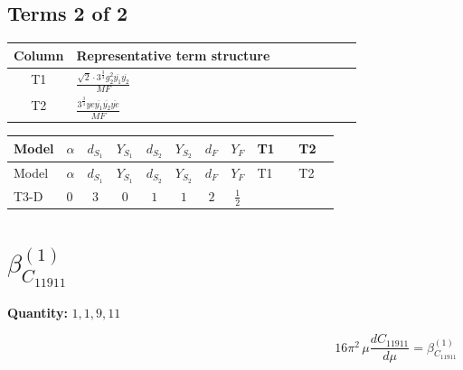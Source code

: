 \documentclass[8pt]{article}
\begin{document}
\begin{landscape}
\subsection*{Terms 2 of 2}
\begin{center}
\begin{tabular}{@{}c >{\raggedright\arraybackslash}p{0.82\linewidth}@{}}
\toprule
Column & Representative term structure \\
\midrule
T1 & \(\displaystyle \frac{\sqrt{2} \cdot 3^{\frac{3}{4}} g_{2}^{2} \overline{y_{1}} \overline{y_{2}}}{MF}\) \\
\midrule
T2 & \(\displaystyle \frac{3^{\frac{3}{4}} ye \overline{y_{1}} \overline{y_{2}} \overline{ye}}{MF}\) \\
\midrule
\bottomrule
\end{tabular}
\end{center}
\smallskip
\tiny
\begin{longtable}{@{}llcccccc >{\raggedright\arraybackslash}p{0.21\linewidth} >{\raggedright\arraybackslash}p{0.21\linewidth}@{}}
\toprule
Model & $\alpha$ & $d_{S_1}$ & $Y_{S_1}$ & $d_{S_2}$ & $Y_{S_2}$ & $d_F$ & $Y_F$ & T1 & T2 \\
\midrule
\endfirsthead
\toprule
Model & $\alpha$ & $d_{S_1}$ & $Y_{S_1}$ & $d_{S_2}$ & $Y_{S_2}$ & $d_F$ & $Y_F$ & T1 & T2 \\
\midrule
\endhead
T3-D & $0$ & $3$ & $0$ & $1$ & $1$ & $2$ & $\frac{1}{2}$ & \scriptsize\adjustbox{max width=\linewidth}{$\begin{gathered} - \frac{\sqrt{2} \cdot 3^{\frac{3}{4}} g_{2}^{2} \overline{y_{1}} \overline{y_{2}}}{3 MF}\end{gathered}$} & \scriptsize\adjustbox{max width=\linewidth}{$\begin{gathered} \frac{3^{\frac{3}{4}} ye \overline{y_{1}} \overline{y_{2}} \overline{ye}}{12 MF}\end{gathered}$} \\
\midrule
\bottomrule
\end{longtable}
\clearpage
\section*{$\beta_{C_{11911}}^{(1)}$}
\noindent\textbf{Quantity: }$\mathrm{1,1,9,11}$\par\smallskip
\[16\pi^2\,\mu\frac{d C_{11911}}{d\mu}=\beta_{C_{11911}}^{(1)}\]

\end{landscape}
\end{document}
